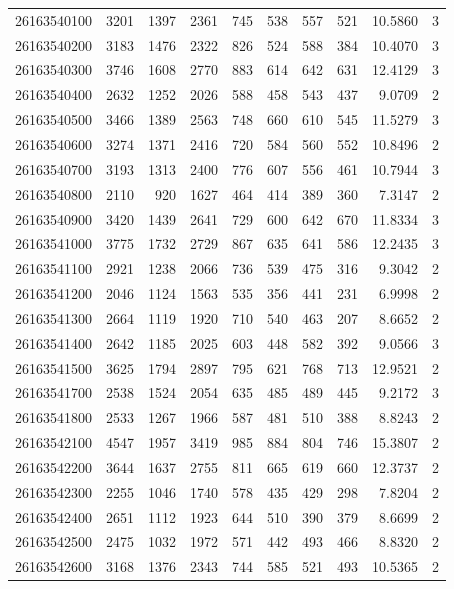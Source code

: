 \documentclass[11pt,landscape]{article}
\begin{document}
{\begin{longtable}[]{@{}lrrrrrrrrr@{}}
26163540100 & 3201 & 1397 & 2361 & 745 & 538 & 557 & 521 & 10.5860 & 3 \\
26163540200 & 3183 & 1476 & 2322 & 826 & 524 & 588 & 384 & 10.4070 & 3 \\
26163540300 & 3746 & 1608 & 2770 & 883 & 614 & 642 & 631 & 12.4129 & 3 \\
26163540400 & 2632 & 1252 & 2026 & 588 & 458 & 543 & 437 & 9.0709 & 2 \\
26163540500 & 3466 & 1389 & 2563 & 748 & 660 & 610 & 545 & 11.5279 & 3 \\
26163540600 & 3274 & 1371 & 2416 & 720 & 584 & 560 & 552 & 10.8496 & 2 \\
26163540700 & 3193 & 1313 & 2400 & 776 & 607 & 556 & 461 & 10.7944 & 3 \\
26163540800 & 2110 & 920 & 1627 & 464 & 414 & 389 & 360 & 7.3147 & 2 \\
26163540900 & 3420 & 1439 & 2641 & 729 & 600 & 642 & 670 & 11.8334 & 3 \\
26163541000 & 3775 & 1732 & 2729 & 867 & 635 & 641 & 586 & 12.2435 & 3 \\
26163541100 & 2921 & 1238 & 2066 & 736 & 539 & 475 & 316 & 9.3042 & 2 \\
26163541200 & 2046 & 1124 & 1563 & 535 & 356 & 441 & 231 & 6.9998 & 2 \\
26163541300 & 2664 & 1119 & 1920 & 710 & 540 & 463 & 207 & 8.6652 & 2 \\
26163541400 & 2642 & 1185 & 2025 & 603 & 448 & 582 & 392 & 9.0566 & 3 \\
26163541500 & 3625 & 1794 & 2897 & 795 & 621 & 768 & 713 & 12.9521 & 2 \\
26163541700 & 2538 & 1524 & 2054 & 635 & 485 & 489 & 445 & 9.2172 & 3 \\
26163541800 & 2533 & 1267 & 1966 & 587 & 481 & 510 & 388 & 8.8243 & 2 \\
26163542100 & 4547 & 1957 & 3419 & 985 & 884 & 804 & 746 & 15.3807 & 2 \\
26163542200 & 3644 & 1637 & 2755 & 811 & 665 & 619 & 660 & 12.3737 & 2 \\
26163542300 & 2255 & 1046 & 1740 & 578 & 435 & 429 & 298 & 7.8204 & 2 \\
26163542400 & 2651 & 1112 & 1923 & 644 & 510 & 390 & 379 & 8.6699 & 2 \\
26163542500 & 2475 & 1032 & 1972 & 571 & 442 & 493 & 466 & 8.8320 & 2 \\
26163542600 & 3168 & 1376 & 2343 & 744 & 585 & 521 & 493 & 10.5365 & 2 \\

\end{longtable}}
\end{document}
